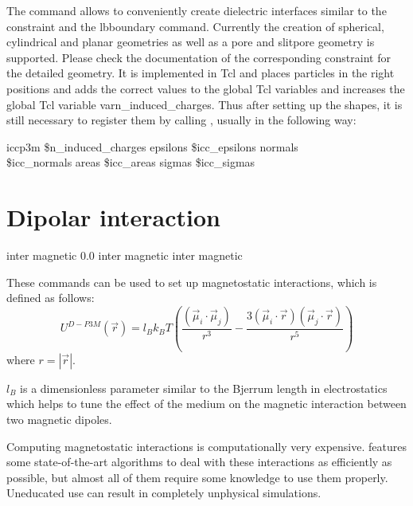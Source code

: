 The command  allows to conveniently create
dielectric interfaces similar to the constraint and the lbboundary
command. Currently the creation of spherical, cylindrical and planar
geometries as well as a pore and slitpore geometry is supported.
Please check the documentation of the corresponding constraint for the detailed geometry.
It is implemented
in Tcl and places particles in the right positions and adds the
correct values to the global Tcl variables 
   and increases
the global Tcl variable var{n\_induced\_charges}. Thus after setting
up the shapes, it is still necessary to register them by calling
, usually in the following way:
\begin{code}
  iccp3m \$n\_induced\_charges epsilons \$icc\_epsilons normals \\ 
  \$icc\_normals areas \$icc\_areas sigmas \$icc\_sigmas
\end{code}

\section{Dipolar interaction}
\label{sec:inter-dipolar}

\begin{essyntax}
   inter magnetic 0.0
   inter magnetic
   inter magnetic 
\end{essyntax}

These commands can be used to set up magnetostatic interactions, which
is defined as follows:
\begin{equation}
  U^{D-P3M}(\vec{r}) = l_{B} k_B T \left( \frac{(\vec{\mu}_i \cdot \vec{\mu}_j)}{r^3} 
  - \frac{3  (\vec{\mu}_i \cdot \vec{r})  (\vec{\mu}_j \cdot \vec{r}) }{r^5} \right)
\end{equation}
where $r=|\vec{r}|$.

$l_{B}$ is a dimensionless parameter similar to the Bjerrum length in
electrostatics which helps to tune the effect of the medium on the
magnetic interaction between two magnetic dipoles.

Computing magnetostatic interactions is computationally very
expensive.  \es{} features some state-of-the-art algorithms to deal
with these interactions as efficiently as possible, but almost all of
them require some knowledge to use them properly.  Uneducated use can
result in completely unphysical simulations.

